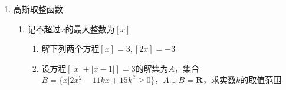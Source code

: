 \begin{enumerate}
\begin{enumerate}
\begin{jieda}
\begin{enumerate}
                \item 乘常数 \\
                原式$=(\frac{1}{2a} + \frac{1}{2b}) \times ab + \frac{8}{a+b} = \frac{a+b}{2} + \frac{8}{a+b} \geq 2\sqrt{\frac{a+b}{2} \cdot \frac{8}{a+b}} = 4$，当且仅当$\frac{a+b}{2} = \frac{8}{a+b}$，即$a+b=4$时取等号。
            \end{enumerate}
            \ps 容易出现的错解：消元后分别利用均值不等式得到答案5。\textbf{应用多次平均值不等式时应注意不等式方向是否相同，取等条件是否一致。}
        \end{jieda}
        \item 
        \begin{enumerate}
            \item 已知正实数$a, b$满足$a+b = 4$，则$\frac{1}{a+1} + \frac{1}{b+3}$的最小值是.
            \begin{jieda}
                $\frac{1}{a+1} + \frac{1}{b+3} = (\frac{1}{a+1} + \frac{1}{b+3}) \times (a+1+b+3) \times \frac{1}{8} = (2+\frac{b+3}{a+1} + \frac{a+1}{b+3}) \times \frac{1}{8} \geq \frac{1}{2}$，当且仅当$a = 3, b = 1$时取等号.
            \end{jieda}
            \item 已知正实数$a, b$满足$4a+3b = 1$，则$\frac{1}{2a+b} + \frac{1}{a+b}$的最小值是.
            \begin{jieda}
                $\frac{1}{2a+b} + \frac{1}{a+b} = \frac{1}{2a+b} + \frac{2}{2a+2b} = (\frac{1}{2a+b} + \frac{2}{2a+2b}) \times (2a + b + 2a + 2b) = 1 + 2 + \frac{2a+2b}{a+b} + \frac{2(2a+b)}{2a+2b} \geq 3+2\sqrt{2}$，当且仅当$a = \frac{3\sqrt{2}}{2}-2, b = 3-2\sqrt{2}$时取等号. \\
                \ps 体会“基”的思想：将分母看做一组“基”，线性组合表示限制条件，根据系数对目标式进行变形.
            \end{jieda}
        \end{enumerate}
    \end{enumerate}
    \item 高斯取整函数
    \begin{enumerate}
        \item 记不超过$x$的最大整数为$[x]$
        \begin{enumerate}[1.]
            \item 解下列两个方程$[x] = 3, [2x] = -3$ 
            \item 设方程$[|x| + |x-1|] = 3$的解集为$A$，集合$B = \{x | 2x^2 - 11kx+15k^2 \geq 0\}$，$A \cup B = \mathbf{R}$，求实数$k$的取值范围

\end{enumerate}
\end{enumerate}
\end{enumerate}
